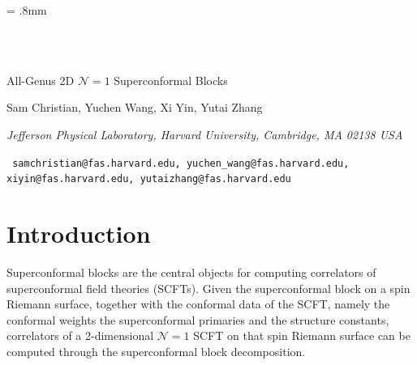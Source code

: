 \documentclass[12pt]{article}
\renewcommand{\title}[1]{\vbox{\center\LARGE{#1}}\vspace{5mm}}
\renewcommand{\author}[1]{\vbox{\center#1}\vspace{5mm}}
\newcommand{\address}[1]{\vbox{\center\em#1}}
\newcommand{\email}[1]{\vbox{\center\tt#1}\vspace{5mm}}
\begin{document}
\unitlength = .8mm

\begin{titlepage}

\begin{center}

\hfill \\
\hfill \\
\vskip 1cm

\title{All-Genus 2D \texorpdfstring{$\mathcal{N}=1$}{N=1} Superconformal Blocks}

\author{Sam Christian, Yuchen Wang, Xi Yin, Yutai Zhang}

\address{Jefferson Physical Laboratory, Harvard University,
Cambridge, MA 02138 USA
}

\email{
    samchristian@fas.harvard.edu, yuchen\_wang@fas.harvard.edu, xiyin@fas.harvard.edu, yutaizhang@fas.harvard.edu}

\end{center}


\vfill

\end{titlepage}

\eject

\begingroup
\hypersetup{linkcolor=black}

\endgroup

\section{Introduction}

Superconformal blocks are the central objects for computing correlators of superconformal field theories (SCFTs). Given the superconformal block on a spin Riemann surface, together with the conformal data of the SCFT, namely the conformal weights the superconformal primaries and the structure constants, correlators of a 2-dimensional $\mathcal{N}=1$ SCFT on that spin Riemann surface can be computed through the superconformal block decomposition. 
\end{document}
